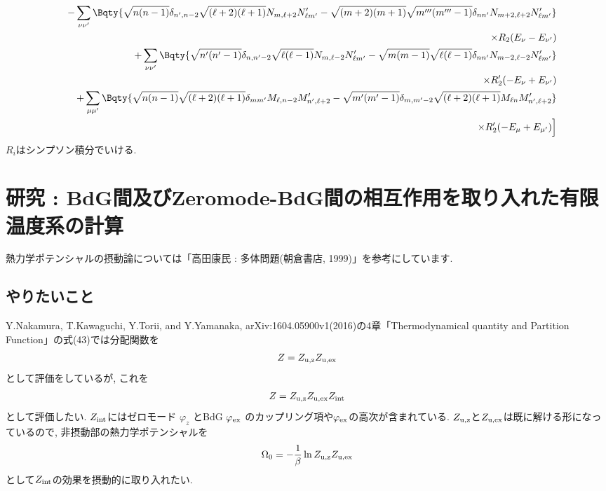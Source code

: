\documentclass[10.5pt,a4paper]{jreport}
\begin{document}
\begin{eqnarray}
    \nonumber &&- \sum_{\nu\nu'}\Bqty{\sqrt{n(n-1)}\delta_{n', n-2}\sqrt{(\ell +2)(\ell +1)}N_{m, \ell +2}N_{\ell m'}' - \sqrt{(m+2)(m+1)}\sqrt{m'''(m'''-1)}\delta_{nn'}N_{m+2, \ell +2}N_{\ell m'}'}\\
    \nonumber&&\hspace{14cm}\times R_2(E_\nu - E_{\nu'})\\
    \nonumber &&+ \sum_{\nu\nu'}\Bqty{\sqrt{n'(n'-1)}\delta_{n, n'-2}\sqrt{\ell (\ell -1)}N_{m, \ell -2}N_{\ell m'}' - \sqrt{m(m-1)}\sqrt{\ell (\ell -1)}\delta_{nn'}N_{m-2, \ell -2}N_{\ell m'}'}\\
    \nonumber&&\hspace{14cm}\times R_2'(-E_\nu + E_{\nu'})\\
    \nonumber&&+\sum_{\mu\mu'}\Bqty{\sqrt{n(n-1)}\sqrt{(\ell +2)(\ell +1)}\delta_{mm'}M_{\ell , n-2}M_{n', \ell +2}' - \sqrt{m'(m'-1)}\delta_{m, m'-2}\sqrt{(\ell +2)(\ell +1)}M_{\ell n}M_{n', \ell +2}'}\\
    \nonumber&&\hspace{14cm}\times R_2'(- E_\mu + E_{\mu'})\Bigr]\\
\end{eqnarray}
$R_i$はシンプソン積分でいける.
\newpage
\chapter{研究 : BdG間及びZeromode-BdG間の相互作用を取り入れた有限温度系の計算}
熱力学ポテンシャルの摂動論については「高田康民 : 多体問題(朝倉書店, 1999)」を参考にしています.
\section{やりたいこと}
Y.Nakamura, T.Kawaguchi, Y.Torii, and Y.Yamanaka, arXiv:1604.05900v1(2016)の4章「Thermodynamical quantity and Partition Function」の式(43)では分配関数を
\begin{eqnarray}
  Z = Z_{\rm u, z}Z_{\rm u,ex}
\end{eqnarray}
として評価をしているが, これを
\begin{eqnarray}
  Z = Z_{\rm u, z}Z_{\rm u,ex}Z_{\rm \rm int}
\end{eqnarray}
として評価したい. $Z_{\rm \rm int}$にはゼロモード $\varphi_{z}$ とBdG $\varphi_{\rm ex}$ のカップリング項や$\varphi_{\rm ex}$の高次が含まれている. $Z_{\rm u, z}$と$Z_{\rm u,ex}$は既に解ける形になっているので, 非摂動部の熱力学ポテンシャルを
\begin{eqnarray}
  \Omega_0 = -\frac{1}{\beta}\ln Z_{\rm u, z}Z_{\rm u,ex}
\end{eqnarray}
として$Z_{\rm \rm int}$の効果を摂動的に取り入れたい.
\end{document}
